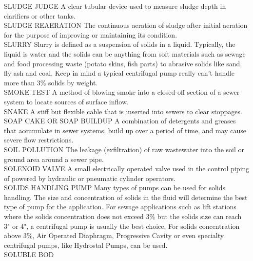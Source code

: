 SLUDGE JUDGE
A clear tubular device used to measure sludge depth in clarifiers or other tanks.
\vspace{0.3cm}\\
SLUDGE REAERATION
The continuous aeration of sludge after initial aeration for the purpose of improving or maintaining its condition.
\vspace{0.3cm}\\
SLURRY
Slurry is defined as a suspension of solids in a liquid. Typically, the liquid is water and the solids can be anything from soft materials such as sewage and food processing waste (potato skins, fish parts) to abrasive solids like sand, fly ash and coal. Keep in mind a typical centrifugal pump really can’t handle more than 3\% solids by weight.
\vspace{0.3cm}\\
SMOKE TEST
A method of blowing smoke into a closed-off section of a sewer system to locate sources of surface inflow. 
\vspace{0.3cm}\\
SNAKE
A stiff but flexible cable that is inserted into sewers to clear stoppages. 
\vspace{0.3cm}\\
SOAP CAKE OR SOAP BUILDUP
A combination of detergents and greases that accumulate in sewer systems, build up over a period of time, and may cause severe flow restrictions. 
\vspace{0.3cm}\\
SOIL POLLUTION
The leakage (exfiltration) of raw wastewater into the soil or ground area around a sewer pipe. 
\vspace{0.3cm}\\
SOLENOID VALVE
A small electrically operated valve used in the control piping of powered by hydraulic or pneumatic cylinder operators.
\vspace{0.3cm}\\
SOLIDS HANDLING PUMP
Many types of pumps can be used for solids handling. The size and concentration of solids in the fluid will determine the best type of pump for the application. For sewage applications such as lift stations where the solids concentration does not exceed 3\% but the solids size can reach 3" or 4", a centrifugal pump is usually the best choice. For solids concentration above 3\%, Air Operated Diaphragm, Progressive Cavity or even specialty centrifugal pumps, like Hydrostal Pumps, can be used.
\vspace{0.3cm}\\
SOLUBLE BOD
